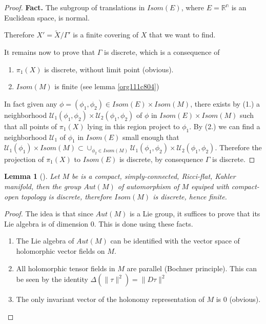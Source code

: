 \documentclass[11pt]{article}
\newtheorem{lemma}[theorem]{Lemma}
\begin{document}
\begin{proof}
\textbf{Fact.} The subgroup of translations in \(Isom(E)\), where \(E = \mathbb{R^n}\) is an Euclidean space, is
normal.

Therefore \(X' = \tilde X/\Gamma'\) is a finite covering of \(X\) that we want to find.

It remains now to prove that \(\Gamma\) is discrete, which is a consequence of
\begin{enumerate}
\item \(\pi_1(X)\) is discrete, without limit point (obvious).
\item \(Isom(M)\) is finite (see lemma \ref{org111c804})
\end{enumerate}
In fact given any \(\phi = (\phi_1,\phi_2) \in Isom(E)\times Isom(M)\), there exists by (1.) a neighborhood \(\mathcal{U}_1(\phi_1,\phi_2)\times \mathcal{U}_2(\phi_1,\phi_2)\) of \(\phi\) in \(Isom(E)\times
Isom(M)\) such that all points of \(\pi_1(X)\) lying in this region project to \(\phi_1\). By (2.)
we can find a neighborhood \(\mathcal{U}_1\) of \(\phi_1\) in \(Isom(E)\) small enough that \(\mathcal{U}_1(\phi_1)\times Isom(M) \subset \cup_{\phi_2\in Isom(M)}
\mathcal{U}_1(\phi_1,\phi_2)\times \mathcal{U}_2(\phi_1,\phi_2)\). Therefore the projection of
\(\pi_1(X)\) to \(Isom(E)\) is discrete, by consequence \(\Gamma\) is discrete.
\end{proof}

\begin{lemma}[]
\label{lem:Isom-discrete}
\label{org111c804}
Let \(M\) be is a compact, simply-connected, Ricci-flat, Kahler manifold, then the group \(Aut(M)\) of
automorphism of \(M\) equiped with compact-open topology is discrete, therefore \(Isom(M)\) is discrete,
hence finite. 
\end{lemma}
\begin{proof}
The idea is that since \(Aut(M)\) is a Lie group, it suffices to prove that its Lie algebra is of
dimension 0. This is done using these facts. 
\begin{enumerate}
\item The Lie algebra of \(Aut(M)\) can be identified with the vector space of holomorphic vector
fields on \(M\).
\item All holomorphic tensor fields in \(M\) are parallel (Bochner principle). This can be seen by the identity
\(\Delta(\|\tau \|^2) = \|D\tau \|^2\)
\item The only invariant vector of the holonomy representation of \(M\) is \(0\) (obvious).
\end{enumerate}
\end{proof}
\end{document}
